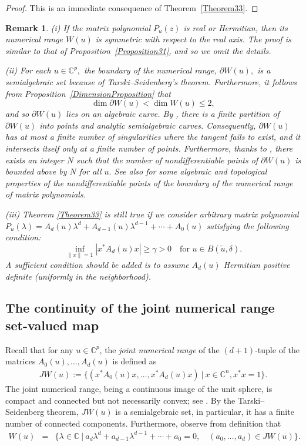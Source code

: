 \documentclass[10pt,reqno]{amsart}
\theoremstyle{break-italic}
\theoremstyle{break-italic}
\theoremstyle{break-italic}
\theoremstyle{break-italic}
\theoremstyle{break-italic}
\theoremstyle{break-italic}
\theoremstyle{break-italic}
\theoremstyle{break-italic}
\theoremstyle{break-roman}
\newtheorem{remark}[satz]{Remark}
\theoremstyle{standard}
\theoremstyle{varthm-roman}
\theoremstyle{varthm-italic}
\theoremstyle{varthm-roman-break}
\theoremstyle{varthm-italic-break}
\theoremstyle{varthm-roman-no-punctuation}
\theoremstyle{varthm-italic-no-punctuation}
\numberwithin{equation}{section}
\begin{document}
\begin{proof}
This is an immediate consequence of Theorem~\ref{Theorem33}.
\end{proof}

\begin{remark}\rm (i) 
If the matrix polynomial $P_{{u}}(z)$ is real or Hermitian, then its numerical range $W(u)$ is symmetric with respect to the real axis.
The proof is similar to that of Proposition~\ref{Proposition31}, and so we omit the details.

(ii) For each $u \in \mathbb{C}^p,$ the boundary of the numerical range, $\partial W(u),$ is a semialgebraic set because of Tarski--Seidenberg's theorem.
Furthermore, it follows from Proposition~\ref{DimensionProposition} that
$$\dim \partial W(u) < \dim W(u) \le 2,$$
and so $\partial W(u)$ lies on an algebraic curve. By \cite[Theorem~1.1]{HP2017}, there is a finite partition of $\partial W(u)$ into points and analytic semialgebraic curves. Consequently, $\partial W(u)$ has at most a finite number of singularities where the tangent fails to exist, and it intersects itself only at a finite number of points. Furthermore, thanks to \cite[Theorem~1.4]{HP2017}, there exists an integer $N$ such that the number of nondifferentiable points of $\partial W(u)$ is bounded above by $N$ for all $u.$ See also \cite{Jonckheere1998, Maroulas1997} for some algebraic and topological properties of the nondifferentiable points of the boundary of the numerical range of matrix polynomials.

 (iii)  Theorem \ref{Theorem33} is still true if we consider arbitrary matrix polynomial $P_{u}(\lambda) = A_d(u) \lambda^d  + A_{d - 1}(u) \lambda^{d - 1}  + \cdots + A_{0}(u)$ satisfying the  following condition:
$$
\inf_{\|x\|=1} |x^* A_d(u) x| \geq \gamma > 0 \quad \text{for } u \in B(\tilde{u}, \delta).
$$
A sufficient condition should be added is to assume $A_d(u)$ Hermitian positive definite (uniformly in the neighborhood).
\end{remark}


\subsection{The continuity of the joint numerical range set-valued map}

Recall that for any $u\in \mathbb C^p$, the {\em joint numerical range} of  the $(d + 1)$-tuple of the matrices $A_0(u), \ldots, A_{d}(u)$ is defined as
\begin{eqnarray*}
JW(u) := \{(x^* A_0(u) x, \ldots, x^*A_{d}(u)x) \ | \   x \in \mathbb{C}^n, x^*x=1\}.
\end{eqnarray*}
The joint numerical range, being a continuous image of the unit sphere, is compact and connected but not necessarily convex; see \cite{Binding1991}. By the Tarski--Seidenberg theorem, $JW(u)$ is a semialgebraic set, in particular, it has a finite number of connected components. Furthermore, observe from definition that
\begin{eqnarray*}
W(u) &=& \{ \lambda \in \mathbb{C} \ | \ a_d \lambda^d + a_{d - 1} \lambda^{d - 1} + \cdots + a_0 = 0,  \quad (a_{0}, \ldots, a_d) \in JW(u) \}.
\end{eqnarray*}
\end{document}
